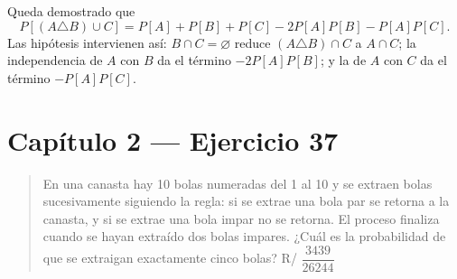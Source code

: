 \documentclass[11pt]{article}
\begin{document}
\begin{resp}
Queda demostrado que
\[
P[(A\triangle B)\cup C]=P[A]+P[B]+P[C]-2P[A]P[B]-P[A]P[C].
\]
Las hip\'otesis intervienen as\'i: $B\cap C=\varnothing$ reduce $(A\triangle B)\cap C$ a $A\cap C$; la independencia de $A$ con $B$ da el t\'ermino $-2P[A]P[B]$; y la de $A$ con $C$ da el t\'ermino $-P[A]P[C]$.
\end{resp}

\section*{Cap\'itulo 2 --- Ejercicio 37}

\begin{quote}
En una canasta hay 10 bolas numeradas del 1 al 10 y se extraen bolas sucesivamente siguiendo la regla: si se extrae una bola par se retorna a la canasta, y si se extrae una bola impar no se retorna. El proceso finaliza cuando se hayan extra\'ido dos bolas impares. ¿Cu\'al es la probabilidad de que se extraigan exactamente cinco bolas? \hfill R/ $\dfrac{3439}{26244}$
\end{quote}
\end{document}
